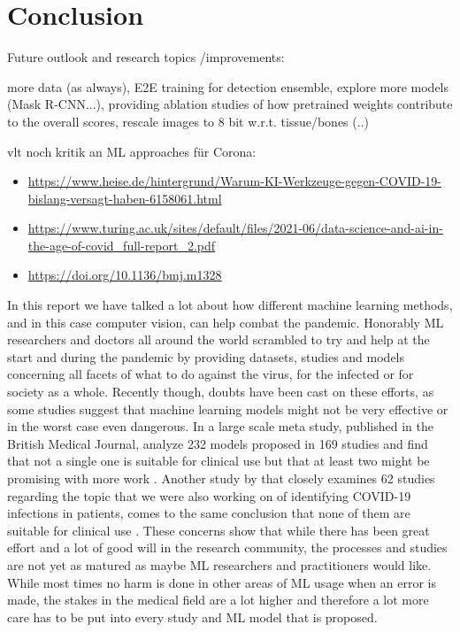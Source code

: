 \chapter{Conclusion}\label{chapter:conclusion}


Future outlook and research topics /improvements:

more data (as always), E2E training for detection ensemble, explore more models (Mask R-CNN...), providing ablation studies of how pretrained weights contribute to the overall scores, rescale images to 8 bit w.r.t. tissue/bones (..)

vlt noch kritik an ML approaches für Corona:
 \begin{itemize}
 	\item \url{https://www.heise.de/hintergrund/Warum-KI-Werkzeuge-gegen-COVID-19-bislang-versagt-haben-6158061.html}
 	\item \url{https://www.turing.ac.uk/sites/default/files/2021-06/data-science-and-ai-in-the-age-of-covid_full-report_2.pdf}
 	\item \url{https://doi.org/10.1136/bmj.m1328}
 \end{itemize}

In this report we have talked a lot about how different machine learning methods, and in this case computer vision, can help combat the pandemic. Honorably ML researchers and doctors all around the world scrambled to try and help at the start and during the pandemic by providing datasets, studies and models concerning all facets of what to do against the virus, for the infected or for society as a whole. Recently though, doubts have been cast on these efforts, as some studies suggest that machine learning models might not be very effective or in the worst case even dangerous. In a large scale meta study, published in the British Medical Journal, \citeauthor{wynants_prediction_2020} analyze 232 models proposed in 169 studies and find that not a single one is suitable for clinical use but that at least two might be promising with more work \autocite{wynants_prediction_2020}. Another study by \citeauthor{aix-covnet_common_2021} that closely examines 62 studies regarding the topic that we were also working on of identifying COVID-19 infections in patients, comes to the same conclusion that none of them are suitable for clinical use \autocite{aix-covnet_common_2021}. These concerns show that while there has been great effort and a lot of good will in the research community, the processes and studies are not yet as matured as maybe ML researchers and practitioners would like. While most times no harm is done in other areas of ML usage when an error is made, the stakes in the medical field are a lot higher and therefore a lot more care has to be put into every study and ML model that is proposed. 